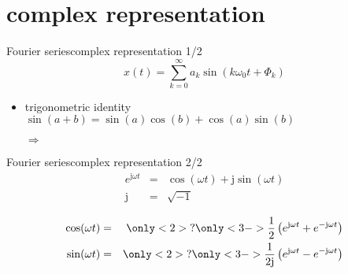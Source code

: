         \section{complex representation}
        \begin{frame}{Fourier series}{complex representation 1/2}
            \begin {equation*}
                x(t) = \sum\limits_{k=0}^{\infty} a_k \sin(k\omega_0 t + \Phi_k) \nonumber
            \end {equation*}
            \pause
            \begin{itemize}
                \item   trigonometric identity $\sin(a+b) = \sin(a)\cos(b) + \cos(a)\sin(b)$
                \item[$\Rightarrow$]
            \end{itemize}
        \end{frame}
        \begin{frame}{Fourier series}{complex representation 2/2}
            \begin{eqnarray*}
                e^{\mathrm{j}\omega t} &=& \cos(\omega t) + \mathrm{j}\sin(\omega t)\nonumber\\
                \mathrm{j} &=& \sqrt{-1}\nonumber
            \end{eqnarray*}

            \begin{eqnarray*}
                \cos(\omega t) &=& \only<2>{?}\only<3->{\frac{1}{2}\left(e^{\mathrm{j}\omega t} + e^{-\mathrm{j}\omega t}\right)}\nonumber\\
                \sin(\omega t) &=& \only<2>{?}\only<3->{\frac{1}{2\mathrm{j}}\left(e^{\mathrm{j}\omega t} - e^{-\mathrm{j}\omega t}\right)}\nonumber
            \end{eqnarray*}
        \end{frame}
        
